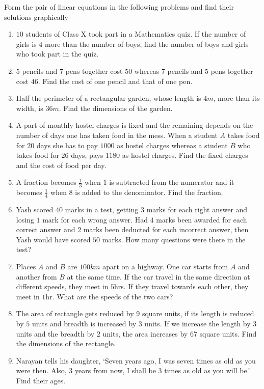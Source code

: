 Form the pair of linear equations in the following problems and find their solutions graphically
\begin{enumerate}[label=\thesubsection.\arabic*,ref=\thesubsection.\theenumi]
\item $10$ students of Class X took part in a Mathematics quiz. If the number of girls is $4$ more than the number of boys, find the number of boys and girls who took part in the quiz.
\item $5$ pencils and $7$ pens together cost \rupee $50$ whereas $7$ pencils and $5$ pens together cost  \rupee $  46$. Find the cost of one pencil and that of one pen.
\item Half the perimeter of a rectangular garden, whose length is $4m$, more than its width, is $36m$. Find the dimensions of the garden.
\item A part of monthly hostel charges is fixed and the remaining depends on the number of days one has taken food in the mess. When a student $A$ takes food for $20$ days she has to pay \rupee $1000$ as hostel charges whereas a student $B$ who takes food for $26$ days, pays \rupee $1180$ as hostel charges. Find the fixed charges and the cost of food per day.
\item A fraction becomes $\frac{1}{3}$ when $1$ is subtracted from the numerator and it becomes $\frac{1}{4}$ when $8$ is added to the denominator. Find the fraction.
\item Yash scored $40$ marks in a test, getting $3$ marks for each right answer and losing $1$ mark for each wrong answer. Had $4$ marks been awarded for each correct answer and $2$ marks been deducted for each incorrect answer, then Yash would have scored $50$ marks. How many questions were there in the test?
\item Places $A$ and $B$ are $100km$ apart on a highway. One car starts from $A$ and another from $B$ at the same time. If the car travel in the same direction at different speeds, they meet in $5$hrs. If they travel towards each other, they meet in $1$hr. What are the speeds of the two cars?
\item The area of rectangle gets reduced by $9$ square units, if its length is reduced by $5$ units and breadth is increased by $3$ units. If we increase the length by $3$ units and the breadth by $2$ units, the area increases by $67$ square units. Find the dimensions of the rectangle.
\item Narayan tells his daughter, `Seven years ago, I was seven times as old as you were then. Also, $3$ years from now, I shall be $3$ times as old as  you will be.' Find their ages. 

\end{enumerate}
